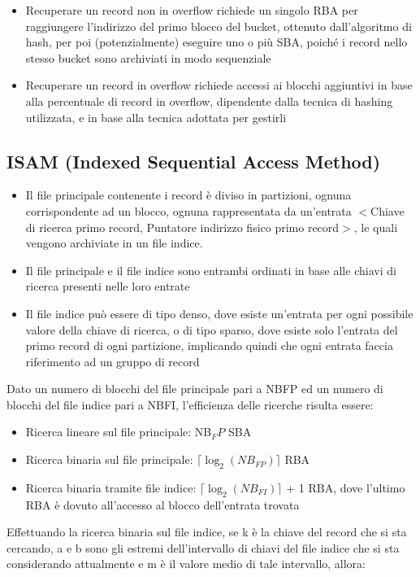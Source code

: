 \documentclass{article}
\begin{document}
\begin{itemize}
  \item Recuperare un record non in overflow richiede un singolo RBA per raggiungere l'indirizzo del primo blocco del bucket, ottenuto dall'algoritmo di hash, per poi (potenzialmente) eseguire uno o più SBA, poiché i record nello stesso bucket sono archiviati in modo sequenziale
  \item Recuperare un record in overflow richiede accessi ai blocchi aggiuntivi in base alla percentuale di record in overflow, dipendente dalla tecnica di hashing utilizzata, e in base alla tecnica adottata per gestirli
\end{itemize}


\pagebreak


\subsection{ISAM (Indexed Sequential Access Method)}
\begin{itemize}
  \item Il file principale contenente i record è diviso in partizioni, ognuna corrispondente ad un blocco, ognuna rappresentata da un'entrata $<$Chiave di ricerca primo record, Puntatore indirizzo fisico primo record$>$, le quali vengono archiviate in un file indice.
  \item Il file principale e il file indice sono entrambi ordinati in base alle chiavi di ricerca presenti nelle loro entrate
  \item Il file indice può essere di tipo denso, dove esiste un'entrata per ogni possibile valore della chiave di ricerca, o di tipo sparso, dove esiste solo l'entrata del primo record di ogni partizione, implicando quindi che ogni entrata faccia riferimento ad un gruppo di record
\end{itemize}
Dato un numero di blocchi del file principale pari a NBFP ed un numero di blocchi del file indice pari a NBFI, l'efficienza delle ricerche risulta essere:
\begin{itemize}
  \item Ricerca lineare sul file principale: NB$_FP$ SBA
  \item Ricerca binaria sul file principale: $\lceil \log_2(NB_{FP}) \rceil
  $ RBA
  \item Ricerca binaria tramite file indice: $\lceil \log_2(NB_{FI}) \rceil
  $ + 1 RBA, dove l'ultimo RBA è dovuto all'accesso al blocco dell'entrata trovata
\end{itemize}
Effettuando la ricerca binaria sul file indice, se k è la chiave del record che si sta cercando, a e b sono gli estremi dell'intervallo di chiavi del file indice che si sta considerando attualmente e m è il valore medio di tale intervallo, allora:
\end{document}
